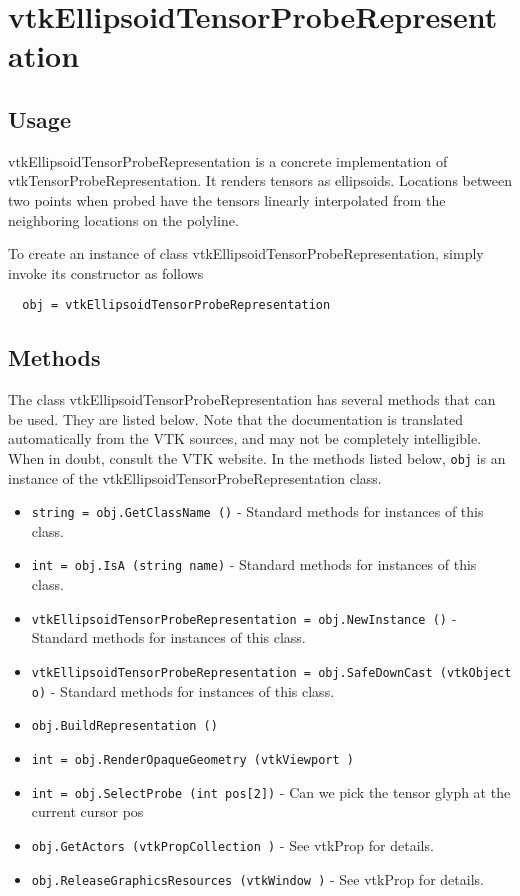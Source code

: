 \section{vtkEllipsoidTensorProbeRepresentation}

\subsection{Usage}

 vtkEllipsoidTensorProbeRepresentation is a concrete implementation of 
 vtkTensorProbeRepresentation. It renders tensors as ellipsoids. Locations
 between two points when probed have the tensors linearly interpolated 
 from the neighboring locations on the polyline.


To create an instance of class vtkEllipsoidTensorProbeRepresentation, simply
invoke its constructor as follows
\begin{verbatim}
  obj = vtkEllipsoidTensorProbeRepresentation
\end{verbatim}
\subsection{Methods}

The class vtkEllipsoidTensorProbeRepresentation has several methods that can be used.
  They are listed below.
Note that the documentation is translated automatically from the VTK sources,
and may not be completely intelligible.  When in doubt, consult the VTK website.
In the methods listed below, \verb|obj| is an instance of the vtkEllipsoidTensorProbeRepresentation class.
\begin{itemize}
\item  \verb|string = obj.GetClassName ()| -  Standard methods for instances of this class.

\item  \verb|int = obj.IsA (string name)| -  Standard methods for instances of this class.

\item  \verb|vtkEllipsoidTensorProbeRepresentation = obj.NewInstance ()| -  Standard methods for instances of this class.

\item  \verb|vtkEllipsoidTensorProbeRepresentation = obj.SafeDownCast (vtkObject o)| -  Standard methods for instances of this class.

\item  \verb|obj.BuildRepresentation ()|

\item  \verb|int = obj.RenderOpaqueGeometry (vtkViewport )|

\item  \verb|int = obj.SelectProbe (int pos[2])| -  Can we pick the tensor glyph at the current cursor pos

\item  \verb|obj.GetActors (vtkPropCollection )| -  See vtkProp for details.  

\item  \verb|obj.ReleaseGraphicsResources (vtkWindow )| -  See vtkProp for details.  

\end{itemize}
